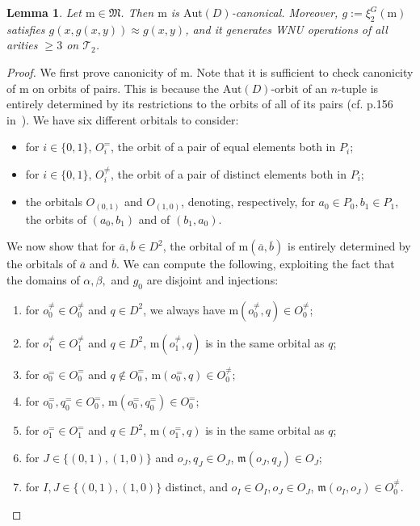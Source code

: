 \documentclass{article}
\newtheorem{lemma}[theorem]{Lemma}
\theoremstyle{remark}
\theoremstyle{definition}
\begin{document}
\begin{lemma}\label{lem:WNUsobtain} Let $\mathrm{m}\in\mathfrak{M}$. Then $\mathrm{m}$ is $\mathrm{Aut}(D)$-canonical. Moreover, $g:=\xi_2^G(\mathrm{m})$ satisfies $g(x,g(x,y))\approx g(x,y)$, and it generates WNU operations of all arities $\geq 3$ on $\mathcal{T}_2$.
\end{lemma}
\begin{proof} We first prove canonicity of $\mathrm{m}$. Note that it is sufficient to check canonicity of $\mathrm{m}$ on orbits of pairs. This is because the $\mathrm{Aut}(D)$-orbit of an $n$-tuple is entirely determined by its restrictions to the orbits of all of its pairs (cf. p.156 in~\cite{BPP-projective-homomorphisms}). We have six different orbitals to consider:
\begin{itemize}
    \item for $i\in\{0,1\}$, $O_i^=$, the orbit of a pair of equal elements both in $P_i$;
    \item for $i\in\{0,1\}$, $O_i^{\neq}$, the orbit of a pair of distinct elements both in $P_i$;
    \item the orbitals $O_{(0,1)}$ and $O_{(1,0)}$, denoting, respectively, for $a_0\in P_0, b_1\in P_1$, the orbits of $(a_0, b_1)$ and of $(b_1, a_0)$.
\end{itemize}
We now show that for $\overline{a}, \overline{b}\in D^2$, the orbital of $\mathrm{m}(\overline{a}, \overline{b})$ is entirely determined by the orbitals of $\overline{a}$ and $\overline{b}$. We can compute the following, exploiting the fact that the domains of $\alpha, \beta,$ and $g_0$ are disjoint and injections:
\begin{enumerate}
    \item for $o_0^{{\neq}}\in O_0^{\neq}$ and $q\in D^2$, we always have $\mathrm{m}(o^{\neq}_0, q)\in O^{\neq}_0$;
    \item for $o_1^{\neq}\in O_1^{\neq}$ and $q\in D^2$, $\mathrm{m}(o^{\neq}_1, q)$ is in the same orbital as $q$;
    \item for $o_0^=\in O_0^=$ and $q\not\in O_0^=$, $\mathrm{m}(o_0^=, q)\in O_0^{\neq}$;
    \item for $o_0^=, q_0^=\in O_0^=$, $\mathrm{m}(o_0^=, q_0^=)\in O_0^=$;
    \item for $o_1^{=}\in O_1^{=}$ and $q\in D^2$, $\mathrm{m}(o^=_1, q)$ is in the same orbital as $q$;
    \item for $J\in \{(0,1), (1,0)\}$ and $o_J, q_J\in O_J$, $\mathfrak{m}(o_J, q_J)\in O_J$;
    \item for $I, J\in \{(0,1), (1,0)\}$ distinct, and $o_I\in O_I, o_J\in O_J$, $\mathfrak{m}(o_I, o_J)\in O_0^{\neq}$.

\end{enumerate}
\end{proof}
\end{document}
